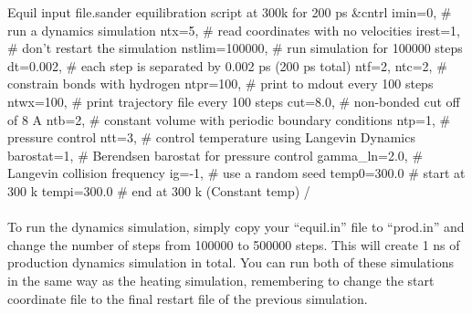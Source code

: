 \begin{inpfile}[label=file:equilin]{Equil input file.}{sander}
equilibration script at 300k for 200 ps
&cntrl
  imin=0,           # run a dynamics simulation
  ntx=5,            # read coordinates with no velocities
  irest=1,          # don't restart the simulation
  nstlim=100000,    # run simulation for 100000 steps
  dt=0.002,         # each step is separated by 0.002 ps (200 ps total)
  ntf=2, ntc=2,     # constrain bonds with hydrogen
  ntpr=100,         # print to mdout every 100 steps
  ntwx=100,         # print trajectory file every 100 steps
  cut=8.0,          # non-bonded cut off of 8 A
  ntb=2,            # constant volume with periodic boundary conditions
  ntp=1,            # pressure control
  ntt=3,            # control temperature using Langevin Dynamics
  barostat=1,       # Berendsen barostat for pressure control
  gamma_ln=2.0,     # Langevin collision frequency
  ig=-1,            # use a random seed
  temp0=300.0       # start at 300 k
  tempi=300.0       # end at 300 k (Constant temp)
/

\end{inpfile}

    \paragraph{}
        To run the dynamics simulation, simply copy your \enquote{equil.in} file to \enquote{prod.in} and change the number of steps from 100000 to 500000 steps. This will create 1 ns of production dynamics simulation in total. You can run both of these simulations in the same way as the heating simulation, remembering to change the start coordinate file to the final restart file of the previous simulation.